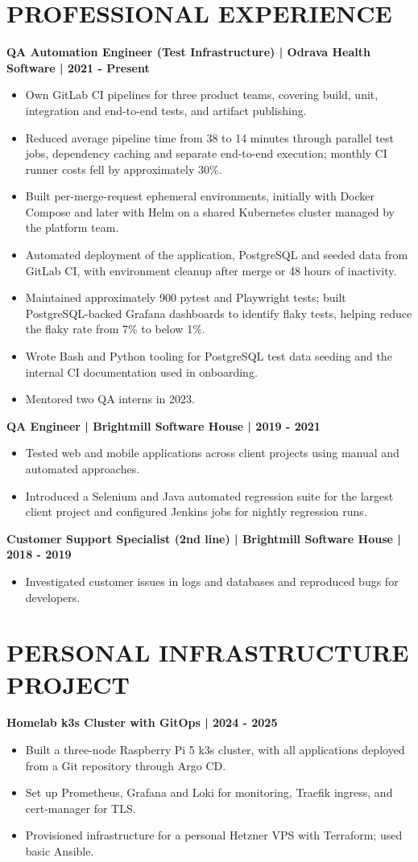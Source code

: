 \documentclass[11pt,a4paper]{article}
\newcommand{\cvsection}[1]{\section*{#1}}
\newcommand{\cvrole}[1]{\par\noindent\textbf{#1}\par}
\begin{document}
\cvsection{PROFESSIONAL EXPERIENCE}
\cvrole{QA Automation Engineer (Test Infrastructure) | Odrava Health Software | 2021 - Present}
\begin{itemize}
\item Own GitLab CI pipelines for three product teams, covering build, unit, integration and end-to-end tests, and artifact publishing.
\item Reduced average pipeline time from 38 to 14 minutes through parallel test jobs, dependency caching and separate end-to-end execution; monthly CI runner costs fell by approximately 30\%.
\item Built per-merge-request ephemeral environments, initially with Docker Compose and later with Helm on a shared Kubernetes cluster managed by the platform team.
\item Automated deployment of the application, PostgreSQL and seeded data from GitLab CI, with environment cleanup after merge or 48 hours of inactivity.
\item Maintained approximately 900 pytest and Playwright tests; built PostgreSQL-backed Grafana dashboards to identify flaky tests, helping reduce the flaky rate from 7\% to below 1\%.
\item Wrote Bash and Python tooling for PostgreSQL test data seeding and the internal CI documentation used in onboarding.
\item Mentored two QA interns in 2023.
\end{itemize}

\newpage
\cvrole{QA Engineer | Brightmill Software House | 2019 - 2021}
\begin{itemize}
\item Tested web and mobile applications across client projects using manual and automated approaches.
\item Introduced a Selenium and Java automated regression suite for the largest client project and configured Jenkins jobs for nightly regression runs.
\end{itemize}

\cvrole{Customer Support Specialist (2nd line) | Brightmill Software House | 2018 - 2019}
\begin{itemize}
\item Investigated customer issues in logs and databases and reproduced bugs for developers.
\end{itemize}

\cvsection{PERSONAL INFRASTRUCTURE PROJECT}
\cvrole{Homelab k3s Cluster with GitOps | 2024 - 2025}
\begin{itemize}
\item Built a three-node Raspberry Pi 5 k3s cluster, with all applications deployed from a Git repository through Argo CD.
\item Set up Prometheus, Grafana and Loki for monitoring, Traefik ingress, and cert-manager for TLS.
\item Provisioned infrastructure for a personal Hetzner VPS with Terraform; used basic Ansible.
\end{itemize}
\end{document}
